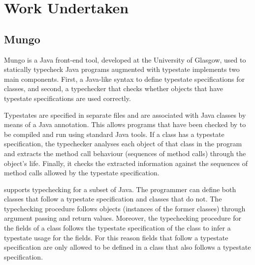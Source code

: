 \section{Work Undertaken}
\label{Research}


\subsection{Mungo}
\label{sub:Mungo}


Mungo\cite{kouzapas16} is a Java front-end tool, developed at the University of Glasgow, used to statically typecheck Java programs augmented with typestate
\Mungo implements two main components. First, a Java-like syntax to define
typestate specifications for classes, and second, a typechecker
that checks whether objects that have typestate specifications are used correctly.

%
Typestates are specified in separate files and
are associated with Java classes by means of a Java
annotation. This allows programs that have been
checked by \Mungo to be compiled and run using standard
Java tools.
%
If a class has a typestate specification, the \Mungo typechecker analyses
each object of that class in the program and extracts the
method call behaviour (sequences of method calls) through the object's life. Finally, it checks the extracted information against
the sequences of method calls allowed by the typestate specification.



\Mungo supports typechecking for a subset of Java.
The programmer can define both classes that follow
a typestate specification and classes that do not.
The typechecking procedure follows objects (instances
of the former classes) through argument passing and
return values. Moreover, the typechecking procedure
for the fields of a class follows the typestate
specification of the class to infer a typestate
usage for the fields. For this reason fields that
follow a typestate specification are only allowed to be defined
in a class that also follows a typestate specification.

